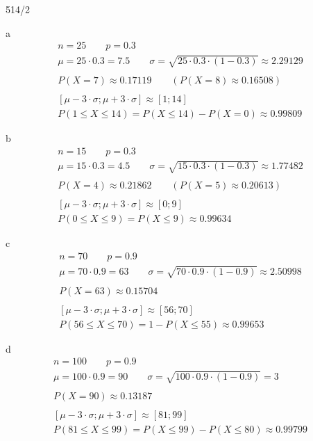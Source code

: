 \begin{exercise}{514/2}
  \item [a]
  \begin{gather*}
    n = 25 \qquad p = 0.3 \\
    \mu = 25 \cdot 0.3 = 7.5 \qquad \sigma = \sqrt{25 \cdot 0.3 \cdot (1 - 0.3)} \approx 2.29129 \\\\
    P(X = 7) \approx 0.17119 \qquad (P(X = 8) \approx 0.16508) \\\\
    [\mu - 3 \cdot \sigma; \mu + 3 \cdot \sigma] \approx [1; 14] \\
    P(1 \leq X \leq 14) = P(X \leq 14) - P(X = 0) \approx 0.99809
  \end{gather*}
  \item [b]
  \begin{gather*}
    n = 15 \qquad p = 0.3 \\
    \mu = 15 \cdot 0.3 = 4.5 \qquad \sigma = \sqrt{15 \cdot 0.3 \cdot (1 - 0.3)} \approx 1.77482 \\\\
    P(X = 4) \approx 0.21862 \qquad (P(X = 5) \approx 0.20613) \\\\
    [\mu - 3 \cdot \sigma; \mu + 3 \cdot \sigma] \approx [0; 9] \\
    P(0 \leq X \leq 9) = P(X \leq 9) \approx 0.99634
  \end{gather*}
  \item [c]
  \begin{gather*}
    n = 70 \qquad p = 0.9 \\
    \mu = 70 \cdot 0.9 = 63 \qquad \sigma = \sqrt{70 \cdot 0.9 \cdot (1 - 0.9)} \approx 2.50998 \\\\
    P(X = 63) \approx 0.15704 \\\\
    [\mu - 3 \cdot \sigma; \mu + 3 \cdot \sigma] \approx [56; 70] \\
    P(56 \leq X \leq 70) = 1 - P(X \leq 55) \approx 0.99653
  \end{gather*}
  \item [d]
  \begin{gather*}
    n = 100 \qquad p = 0.9 \\
    \mu = 100 \cdot 0.9 = 90 \qquad \sigma = \sqrt{100 \cdot 0.9 \cdot (1 - 0.9)} = 3 \\\\
    P(X = 90) \approx 0.13187 \\\\
    [\mu - 3 \cdot \sigma; \mu + 3 \cdot \sigma] \approx [81; 99] \\
    P(81 \leq X \leq 99) = P(X \leq 99) - P(X \leq 80) \approx 0.99799
  \end{gather*}
\end{exercise}
